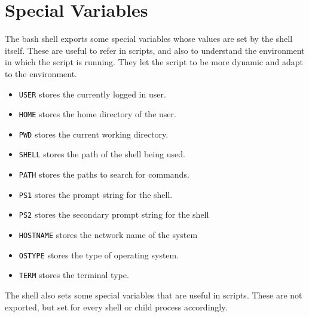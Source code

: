 \section{Special Variables}

The bash shell exports some special variables whose values are set by the shell itself.
These are useful to refer in scripts, and also to understand the environment in which the script is running.
They let the script to be more dynamic and adapt to the environment.

\begin{itemize}
  \item \lstinline{USER} stores the currently logged in user.
  \item \lstinline{HOME} stores the home directory of the user.
  \item \lstinline{PWD} stores the current working directory.
  \item \lstinline{SHELL} stores the path of the shell being used.
  \item \lstinline{PATH} stores the paths to search for commands.
  \item \lstinline{PS1} stores the prompt string for the shell.
  \item \lstinline{PS2} stores the secondary prompt string for the shell
  \item \lstinline{HOSTNAME} stores the network name of the system
  \item \lstinline{OSTYPE} stores the type of operating system.
  \item \lstinline{TERM} stores the terminal type.
\end{itemize}

The shell also sets some special variables that are useful in scripts. These are not exported, but set for every shell or child process accordingly.

